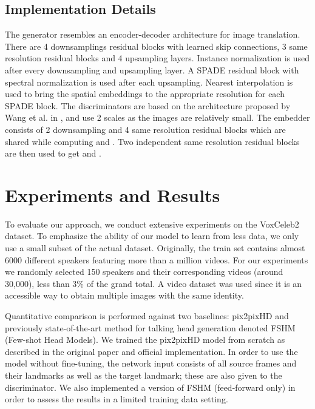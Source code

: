 \documentclass[11pt,a4paper]{article}
\begin{document}
\subsection{Implementation Details}
\label{sec:implementation}
The generator resembles an encoder-decoder architecture for image translation. There are 4 downsamplings residual blocks with learned skip connections, 3 same resolution residual blocks and 4 upsampling layers. Instance normalization \cite{ulyanov2016instance} is used after every downsampling and upsampling layer. A SPADE residual block with spectral normalization \cite{miyato2018spectral,zhang2019self} is used after each upsampling. Nearest interpolation is used to bring the spatial embeddings to the appropriate resolution for each SPADE block. The discriminators are based on the architecture proposed by Wang et al. in \cite{wang2018pix2pixHD}, and use 2 scales as the images are relatively small. The embedder consists of 2 downsampling and 4 same resolution residual blocks which are shared while computing  and . Two independent same resolution residual blocks are then used to get  and .


\section{Experiments and Results}
\label{sec:experiments}

To evaluate our approach, we conduct extensive experiments on the VoxCeleb2 \cite{Chung18b} dataset. To emphasize the ability of our model to learn from less data, we only use a small subset of the actual dataset. Originally, the train set contains almost 6000 different speakers featuring more than a million videos. For our experiments we randomly selected 150 speakers and their corresponding videos (around 30,000), less than 3\% of the grand total. A video dataset was used since it is an accessible way to obtain multiple images with the same identity.

Quantitative comparison is performed against two baselines: pix2pixHD \cite{wang2018pix2pixHD} and previously state-of-the-art method for talking head generation \cite{zakharov2019fewshot} denoted FSHM (Few-shot Head Models). We trained the pix2pixHD model from scratch as described in the original paper and official implementation. In order to use the model without fine-tuning, the network input consists of all source frames and their landmarks as well as the target landmark; these are also given to the discriminator. We also implemented a version of FSHM (feed-forward only) in order to assess the results in a limited training data setting. 
\end{document}
